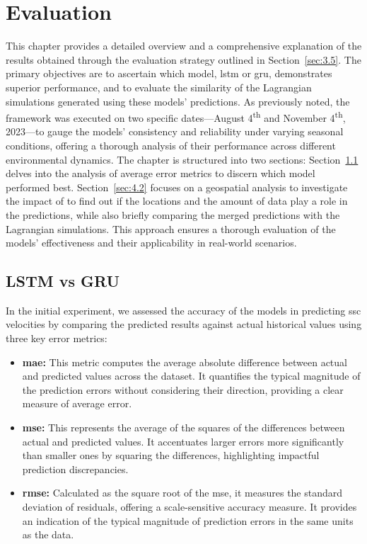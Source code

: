 \graphicspath{{content/chapters/4_evaluation/evaluation_figures}}

\chapter{Evaluation}
\label{chp:evaluation}

This chapter provides a detailed overview and a comprehensive explanation of the results obtained through the evaluation strategy outlined in Section~\ref{sec:3.5}. The primary objectives are to ascertain which model, \acrshort{lstm} or \acrshort{gru}, demonstrates superior performance, and to evaluate the similarity of the Lagrangian simulations generated using these models' predictions. As previously noted, the framework was executed on two specific dates—August 4\textsuperscript{th} and November 4\textsuperscript{th}, 2023—to gauge the models' consistency and reliability under varying seasonal conditions, offering a thorough analysis of their performance across different environmental dynamics. The chapter is structured into two sections: Section~\ref{sec:4.1} delves into the analysis of average error metrics to discern which model performed best. Section~\ref{sec:4.2} focuses on a geospatial analysis to investigate the impact of to find out if the locations and the amount of data play a role in the predictions, while also briefly comparing the merged predictions with the Lagrangian simulations. This approach ensures a thorough evaluation of the models' effectiveness and their applicability in real-world scenarios.

\section{LSTM vs GRU}
\label{sec:4.1}

In the initial experiment, we assessed the accuracy of the models in predicting \acrshort{ssc} velocities by comparing the predicted results against actual historical values using three key error metrics:
\begin{itemize}
    \item \textbf{\acrshort{mae}:} This metric computes the average absolute difference between actual and predicted values across the dataset. It quantifies the typical magnitude of the prediction errors without considering their direction, providing a clear measure of average error.
    \item \textbf{\acrshort{mse}:} This represents the average of the squares of the differences between actual and predicted values. It accentuates larger errors more significantly than smaller ones by squaring the differences, highlighting impactful prediction discrepancies.
    \item \textbf{\acrshort{rmse}:} Calculated as the square root of the \acrshort{mse}, it measures the standard deviation of residuals, offering a scale-sensitive accuracy measure. It provides an indication of the typical magnitude of prediction errors in the same units as the data.
\end{itemize}

